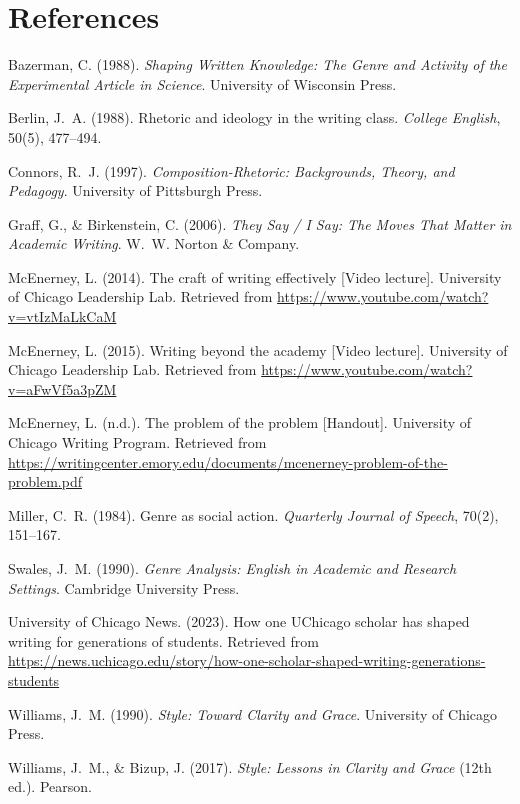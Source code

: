 \documentclass[12pt]{article}
\begin{document}
\section*{References}

Bazerman, C. (1988). \textit{Shaping Written Knowledge: The Genre and Activity of the Experimental Article in Science}. University of Wisconsin Press.

Berlin, J.~A. (1988). Rhetoric and ideology in the writing class. \textit{College English}, 50(5), 477--494.

Connors, R.~J. (1997). \textit{Composition-Rhetoric: Backgrounds, Theory, and Pedagogy}. University of Pittsburgh Press.

Graff, G., \& Birkenstein, C. (2006). \textit{They Say / I Say: The Moves That Matter in Academic Writing}. W.~W. Norton \& Company.

McEnerney, L. (2014). The craft of writing effectively [Video lecture]. University of Chicago Leadership Lab. Retrieved from \url{https://www.youtube.com/watch?v=vtIzMaLkCaM}

McEnerney, L. (2015). Writing beyond the academy [Video lecture]. University of Chicago Leadership Lab. Retrieved from \url{https://www.youtube.com/watch?v=aFwVf5a3pZM}

McEnerney, L. (n.d.). The problem of the problem [Handout]. University of Chicago Writing Program. Retrieved from \url{https://writingcenter.emory.edu/documents/mcenerney-problem-of-the-problem.pdf}

Miller, C.~R. (1984). Genre as social action. \textit{Quarterly Journal of Speech}, 70(2), 151--167.

Swales, J.~M. (1990). \textit{Genre Analysis: English in Academic and Research Settings}. Cambridge University Press.

University of Chicago News. (2023). How one UChicago scholar has shaped writing for generations of students. Retrieved from \url{https://news.uchicago.edu/story/how-one-scholar-shaped-writing-generations-students}

Williams, J.~M. (1990). \textit{Style: Toward Clarity and Grace}. University of Chicago Press.

Williams, J.~M., \& Bizup, J. (2017). \textit{Style: Lessons in Clarity and Grace} (12th ed.). Pearson.
\end{document}
